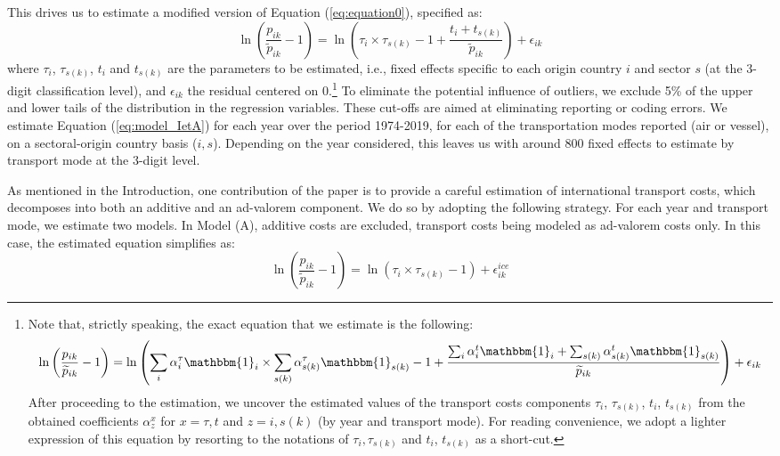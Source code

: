 \documentclass[a4paper,11pt]{article}
\begin{document}
This drives us to estimate a modified version of Equation (\ref{eq:equation0}), specified as:
\begin{equation}
\ln\left(\frac{p_{ik}}{\widetilde{p}_{ik}}-1 \right)= \ln \left(\tau_{i}\times \tau_{s(k)} -1+\frac{t_{i} + t_{s(k)}}{\widetilde{p}_{ik}} \right) + \epsilon_{ik} \label{eq:model_IetA}
\end{equation}
where $\tau_{i}$, $\tau_{s(k)}$, $t_{i}$ and $t_{s(k)}$ are the parameters to be estimated, i.e., fixed effects specific to each origin country $i$ and sector $s$ (at the 3-digit classification level), and $\epsilon_{ik}$ the residual centered on 0.\footnote{Note that, strictly speaking, the exact equation that we estimate is the following:
$$\ln\left(\frac{p_{ik}}{\widetilde{p}_{ik}}-1 \right)= \ln \left(\sum_i \alpha_i^\tau \mathbbm{1}_i \times \sum_{s(k)}\alpha_{s(k)}^\tau \mathbbm{1}_{s(k)}-1 + \frac{\sum_i\alpha_i^t\mathbbm{1}_i + \sum_{s(k)}\alpha^t_{s(k)}\mathbbm{1}_{s(k)}}{\widetilde{p}_{ik}}\right)+\epsilon_{ik} $$
After proceeding to the estimation, we uncover the estimated values of the transport costs components $\tau_{i}$, $\tau_{s(k)}$, $t_{i}$, $t_{s(k)}$ from the obtained coefficients $\alpha^{x}_{z}$ for $x=\tau,t$ and $z=i,s(k)$ (by year and transport mode).
For reading convenience, we adopt a lighter expression of this equation by resorting to the notations of $\tau_i,\tau_{s(k)}$ and $t_i$, $t_{s(k)}$ as a short-cut.}  To eliminate the potential influence of outliers, we exclude 5\% of the upper and lower tails of the distribution in the regression variables.
These cut-offs are aimed at eliminating reporting or coding errors.
We estimate Equation (\ref{eq:model_IetA}) for each year over the period 1974-2019, for each of the transportation modes reported (air or vessel), on a sectoral-origin country basis ($i,s$).
Depending on the year considered, this leaves us with around 800 fixed effects to estimate by transport mode at the 3-digit level.
  \medskip

As mentioned in the Introduction, one contribution of the paper is to provide a careful estimation of international transport costs, which decomposes into both an additive and an ad-valorem component. We do so by adopting the following strategy. For each year and transport mode, we estimate two models. In Model (A), additive costs are excluded, transport costs being modeled as ad-valorem costs only. In this case, the estimated equation simplifies as:
\begin{equation}
\ln\left(\frac{p_{ik}}{\widetilde{p}_{ik}}-1 \right)= \ln \left(\tau_{i}\times\tau_{s(k)}-1 \right) + \epsilon^{ice}_{ik} \label{eq:model_nlI}
\end{equation}
\end{document}
